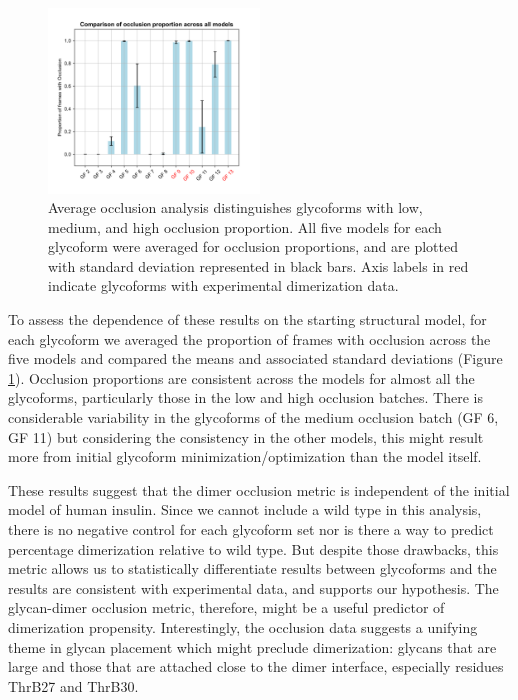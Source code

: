 \documentclass[9pt]{elife}
\begin{document}
\begin{figure}[H]
\centering
\includegraphics[width=0.50\textwidth]{Figures/occlusion_proportion_averaged.png}
\caption{Average occlusion analysis distinguishes glycoforms with low, medium, and high occlusion proportion. All five models for each glycoform were averaged for occlusion proportions, and are plotted with standard deviation represented in black bars. Axis labels in red indicate glycoforms with experimental dimerization data.}
\label{occlusion_results}
\end{figure}

To assess the dependence of these results on the starting structural model, for each glycoform we averaged the proportion of frames with occlusion across the five models and compared the means and associated standard deviations (Figure \ref{occlusion_results}). Occlusion proportions are consistent across the models for almost all the glycoforms, particularly those in the low and high occlusion batches. There is considerable variability in the glycoforms of the medium occlusion batch (GF 6, GF 11) but considering the consistency in the other models, this might result more from initial glycoform minimization/optimization than the model itself.

These results suggest that the dimer occlusion metric is independent of the initial model of human insulin. Since we cannot include a wild type in this analysis, there is no negative control for each glycoform set nor is there a way to predict percentage dimerization relative to wild type. But despite those drawbacks, this metric allows us to statistically differentiate results between glycoforms and the results are consistent with experimental data, and supports our hypothesis. The glycan-dimer occlusion metric, therefore, might be a useful predictor of dimerization propensity. Interestingly, the occlusion data suggests a unifying theme in glycan placement which might preclude dimerization: glycans that are large and those that are attached close to the dimer interface, especially residues ThrB27 and ThrB30.
\end{document}
